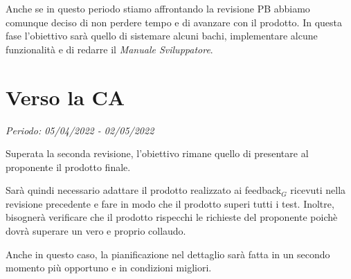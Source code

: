 Anche se in questo periodo stiamo affrontando la revisione PB abbiamo comunque deciso di non perdere tempo e di avanzare con il prodotto. In questa fase l'obiettivo sarà quello di sistemare alcuni bachi, implementare alcune funzionalità e di redarre il \textit{Manuale Sviluppatore}.

\section{Verso la CA}

\textit{Periodo: 05/04/2022 - 02/05/2022}

Superata la seconda revisione, l'obiettivo rimane quello di presentare al proponente il prodotto finale.

Sarà quindi necessario adattare il prodotto realizzato ai feedback$_G$ ricevuti nella revisione precedente e fare in modo che il prodotto superi tutti i test. Inoltre, bisognerà
verificare che il prodotto rispecchi le richieste del proponente poichè dovrà superare un vero e proprio collaudo.

Anche in questo caso, la pianificazione nel dettaglio sarà fatta in un secondo momento più opportuno e in condizioni migliori.
